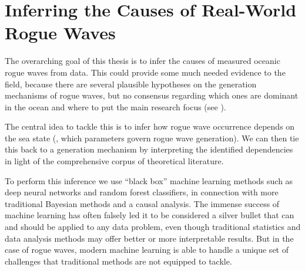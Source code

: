 \chapter{Inferring the Causes of Real-World Rogue Waves} \label{chap:main}

%
The overarching goal of this thesis is to infer the causes of measured oceanic rogue waves from data.
This could provide some much needed evidence to the field, because there are several plausible hypotheses on the generation mechanisms of rogue waves, but no consensus regarding which ones are dominant in the ocean and where to put the main research focus (see ).

The central idea to tackle this is to infer how rogue wave occurrence depends on the sea state (\ie, which parameters govern rogue wave generation). We can then tie this back to a generation mechanism by interpreting the identified dependencies in light of the comprehensive corpus of theoretical literature.

To perform this inference we use \enquote{black box} machine learning methods such as deep neural networks and random forest classifiers, in connection with more traditional Bayesian methods and a causal analysis. The immense success of machine learning has often falsely led it to be considered a silver bullet that can and should be applied to any data problem, even though traditional statistics and data analysis methods may offer better or more interpretable results. But in the case of rogue waves, modern machine learning is able to handle a unique set of challenges that traditional methods are not equipped to tackle.

